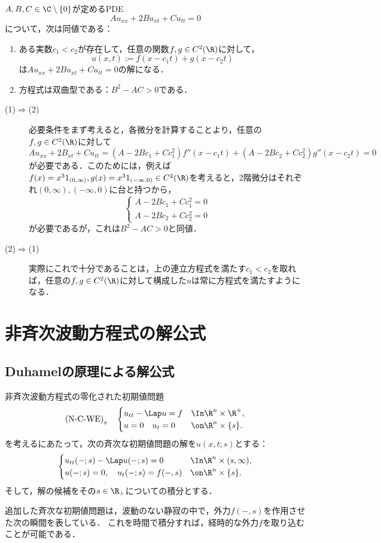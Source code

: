 \documentclass[uplatex,dvipdfmx]{jsreport}
\begin{document}
\begin{example}
    $A,B,C\in\C\setminus\{0\}$が定めるPDE
    \[Au_{xx}+2Bu_{xt}+Cu_{tt}=0\]
    について，次は同値である：
    \begin{enumerate}
        \item ある実数$c_1<c_2$が存在して，任意の関数$f,g\in C^2(\R)$に対して，
        \[u(x,t):=f(x-c_1t)+g(x-c_2t)\]
        は$Au_{xx}+2Bu_{xt}+Cu_{tt}=0$の解になる．
        \item 方程式は双曲型である：$B^2-AC>0$である．
    \end{enumerate}
    \begin{description}
        \item[(1)$\Rightarrow$(2)] 必要条件をまず考えると，各微分を計算することより，任意の$f,g\in C^2(\R)$に対して
        \[Au_{xx}+2B_{xt}+Cu_{tt}=(A-2Bc_1+Cc_1^2)f''(x-c_1t)+(A-2Bc_2+Cc_2^2)g''(x-c_2t)=0\]
        が必要である．このためには，例えば$f(x)=x^31_{(0,\infty)},g(x)=x^31_{(-\infty,0)}\in C^2(\R)$を考えると，2階微分はそれぞれ$(0,\infty),(-\infty,0)$に台と持つから，
        \[\begin{cases}
            A-2Bc_1+Cc_1^2=0\\
            A-2Bc_2+Cc_2^2=0
        \end{cases}\]
        が必要であるが，これは$B^2-AC>0$と同値．
        \item[(2)$\Rightarrow$(1)] 実際にこれで十分であることは，上の連立方程式を満たす$c_1<c_2$を取れば，任意の$f,g\in C^2(\R)$に対して構成した$u$は常に方程式を満たすようになる．
    \end{description}
\end{example}

\section{非斉次波動方程式の解公式}

\subsection{Duhamelの原理による解公式}

\begin{problem}
    非斉次波動方程式の零化された初期値問題
    \[\text{(N-C-WE)}_s\quad\begin{cases}
        u_{tt}-\Lap u=f&\In\R^n\times\R^+,\\
        u=0\quad u_t=0&\on\R^n\times\{s\}.
    \end{cases}\]
    を考えるにあたって，次の斉次な初期値問題の解を$u(x,t;s)$とする：
    \[\begin{cases}
        u_{tt}(-;s)-\Lap u(-;s)=0&\In\R^n\times(s,\infty),\\
        u(-;s)=0,\quad u_t(-;s)=f(-,s)&\on\R^n\times\{s\}.
    \end{cases}\]
    そして，解の候補をその$s\in\R_+$についての積分とする．
\end{problem}
\begin{remarks}[Duhamelの原理の物理的直感]
    追加した斉次な初期値問題は，波動のない静寂の中で，外力$f(-,s)$を作用させた次の瞬間を表している．
    これを時間で積分すれば，経時的な外力$f$を取り込むことが可能である．
\end{remarks}
\end{document}
